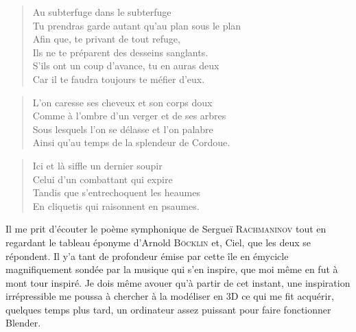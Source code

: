 \begin{verse}
Au subterfuge dans le subterfuge\\
Tu prendras garde autant qu’au plan sous le plan\\
Afin que, te privant de tout refuge,\\
Ils ne te préparent des desseins sanglants.\\
S’ils ont un coup d’avance, tu en auras deux\\
Car il te faudra toujours te méfier d’eux.
\end{verse}

\begin{verse}
L’on caresse ses cheveux et son corps doux\\
Comme à l’ombre d’un verger et de ses arbres\\
Sous lesquels l’on se délasse et l’on palabre\\
Ainsi qu’au temps de la splendeur de Cordoue.
\end{verse}

\begin{verse}
Ici et là siffle un dernier soupir\\
Celui d’un combattant qui expire\\
Tandis que s’entrechoquent les heaumes\\
En cliquetis qui raisonnent en psaumes.
\end{verse}

\begin{prose}
Il me prit d’écouter le poème symphonique  de Sergueï \textsc{Rachmaninov} tout en regardant le tableau éponyme d’Arnold \textsc{Böcklin} et, Ciel, que les deux se répondent. Il y’a tant de profondeur émise par cette île en émycicle magnifiquement sondée par la musique qui s’en inspire, que moi même en fut  à mont tour inspiré. Je dois même avouer qu’à partir de cet instant, une inspiration irrépressible me poussa à chercher à la modéliser en 3D ce qui me fit acquérir, quelques temps plus tard, un ordinateur assez puissant pour faire fonctionner Blender.
\end{prose}


